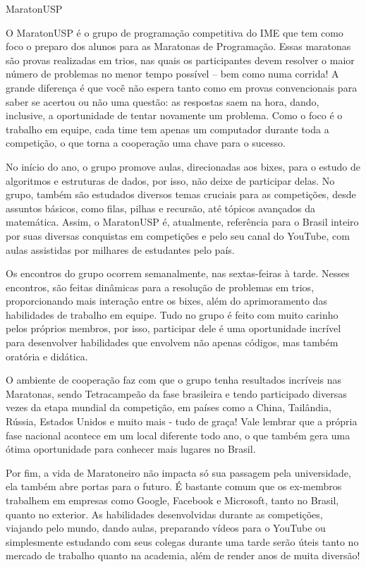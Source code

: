 \begin{subsecao}{MaratonUSP}


O MaratonUSP é o grupo de programação competitiva do IME que tem como foco o
preparo dos alunos para as Maratonas de Programação. Essas maratonas são provas
realizadas em trios, nas quais os participantes devem resolver o maior número
de problemas no menor tempo possível -- bem como numa corrida! A grande
diferença é que você não espera tanto como em provas convencionais para saber
se acertou ou não uma questão: as respostas saem na hora, dando, inclusive, a
oportunidade de tentar novamente um problema. Como o foco é o trabalho em
equipe, cada time tem apenas um computador durante toda a competição, o que
torna a cooperação uma chave para o sucesso.

No início do ano, o grupo promove aulas, direcionadas aos bixes, 
para o estudo de algoritmos e estruturas de dados, por isso, não deixe de
participar delas. No grupo, também são estudados diversos temas cruciais para
as competições, desde assuntos básicos, como filas, pilhas e recursão, até tópicos
avançados da matemática. Assim, o MaratonUSP é, atualmente, referência para o
Brasil inteiro por suas diversas conquistas em competições e pelo seu canal do
YouTube, com aulas assistidas por milhares de estudantes pelo país.

Os encontros do grupo ocorrem semanalmente, nas sextas-feiras à tarde. Nesses
encontros, são feitas dinâmicas para a resolução de problemas em trios,
proporcionando mais interação entre os bixes, além do aprimoramento das habilidades
de trabalho em equipe. Tudo no grupo é feito com muito carinho pelos próprios
membros, por isso, participar dele é uma oportunidade incrível para desenvolver
habilidades que envolvem não apenas códigos, mas também oratória e didática.

O ambiente de cooperação faz com que o grupo tenha resultados incríveis nas
Maratonas, sendo Tetracampeão da fase brasileira e tendo participado diversas
vezes da etapa mundial da competição, em países como a China, Tailândia,
Rússia, Estados Unidos e muito mais - tudo de graça! Vale lembrar que a própria
fase nacional acontece em um local diferente todo ano, o que também gera uma ótima
oportunidade para conhecer mais lugares no Brasil.

Por fim, a vida de Maratoneiro não impacta só sua passagem pela universidade,
ela também abre portas para o futuro. É bastante comum que os ex-membros
trabalhem em empresas como Google, Facebook e Microsoft, tanto no Brasil,
quanto no exterior. As habilidades desenvolvidas durante as competições,
viajando pelo mundo, dando aulas, preparando vídeos para o YouTube ou
simplesmente estudando com seus colegas durante uma tarde serão úteis tanto no
mercado de trabalho quanto na academia, além de render anos de muita diversão!


\end{subsecao}

